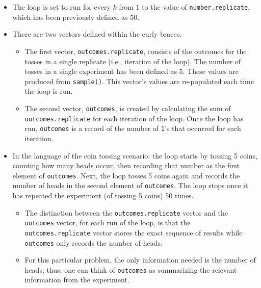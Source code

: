 \documentclass[
]{article}
\begin{document}
\begin{itemize}
\item
  The loop is set to run for every \(k\) from 1 to the value of
  \texttt{number.replicate}, which has been previously defined as 50.
\item
  There are two vectors defined within the curly braces.

  \begin{itemize}
  \item
    The first vector, \texttt{outcomes.replicate}, consists of the
    outcomes for the tosses in a single replicate (i.e., iteration of
    the loop). The number of tosses in a single experiment has been
    defined as 5. These values are produced from \texttt{sample()}. This
    vector's values are re-populated each time the loop is run.
  \item
    The second vector, \texttt{outcomes}, is created by calculating the
    sum of \texttt{outcomes.replicate} for each iteration of the loop.
    Once the loop has run, \texttt{outcomes} is a record of the number
    of \texttt{1}'s that occurred for each iteration.
  \end{itemize}
\item
  In the language of the coin tossing scenario: the loop starts by
  tossing 5 coins, counting how many heads occur, then recording that
  number as the first element of \texttt{outcomes}. Next, the loop
  tosses 5 coins again and records the number of heads in the second
  element of \texttt{outcomes}. The loop stops once it has repeated the
  experiment (of tossing 5 coins) 50 times.

  \begin{itemize}
  \item
    The distinction between the \texttt{outcomes.replicate} vector and
    the \texttt{outcomes} vector, for each run of the loop, is that the
    \texttt{outcomes.replicate} vector stores the exact sequence of
    results while \texttt{outcomes} only records the number of heads.
  \item
    For this particular problem, the only information needed is the
    number of heads; thus, one can think of \texttt{outcomes} as
    summarizing the relevant information from the experiment.
  \end{itemize}
\end{itemize}
\end{document}

